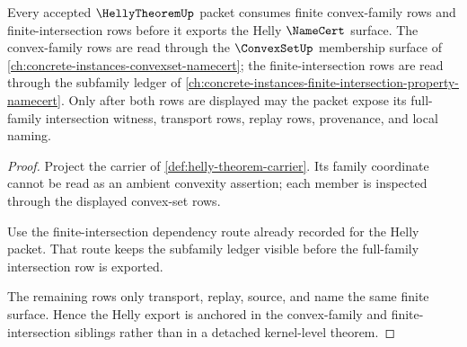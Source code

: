 \begin{theorem}
\label{thm:helly-theorem-convex-dependency-anchor}
Every accepted $\HellyTheoremUp$ packet consumes finite convex-family rows and finite-intersection rows before it exports the Helly $\NameCert$ surface. The convex-family rows are read through the $\ConvexSetUp$ membership surface of \autoref{ch:concrete-instances-convexset-namecert}; the finite-intersection rows are read through the subfamily ledger of \autoref{ch:concrete-instances-finite-intersection-property-namecert}. Only after both rows are displayed may the packet expose its full-family intersection witness, transport rows, replay rows, provenance, and local naming.
\end{theorem}
\begin{proof}
Project the carrier of \autoref{def:helly-theorem-carrier}. Its family coordinate cannot be read as an ambient convexity assertion; each member is inspected through the displayed convex-set rows.

Use the finite-intersection dependency route already recorded for the Helly packet. That route keeps the subfamily ledger visible before the full-family intersection row is exported.

The remaining rows only transport, replay, source, and name the same finite surface. Hence the Helly export is anchored in the convex-family and finite-intersection siblings rather than in a detached kernel-level theorem.
\end{proof}
